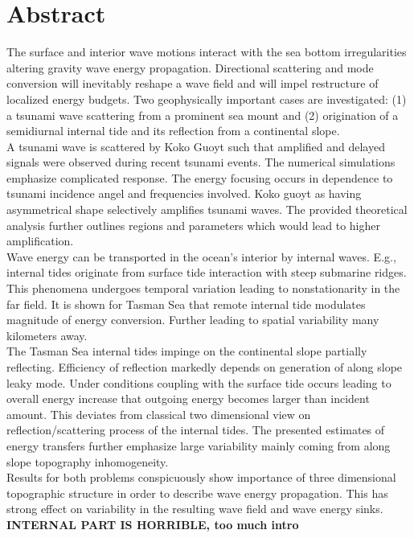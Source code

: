 \section*{Abstract}
The surface and interior wave motions interact with the sea bottom irregularities altering gravity wave energy propagation. Directional scattering and mode conversion will inevitably reshape a wave field and will impel restructure of localized energy budgets. Two geophysically important cases are investigated: (1) a tsunami wave scattering from a prominent sea mount and (2) origination of a semidiurnal internal tide and its reflection    from a continental slope.\\
A tsunami wave is scattered by Koko Guoyt such that amplified and delayed signals were observed during recent tsunami events. The numerical simulations emphasize complicated response. The energy focusing occurs in dependence to tsunami incidence angel and frequencies involved. Koko guoyt as having asymmetrical shape selectively amplifies tsunami waves. The provided theoretical analysis further outlines regions and parameters which would lead to higher amplification.\\
Wave energy can be transported in the ocean's interior by internal waves. E.g., internal tides originate from surface tide interaction with steep submarine ridges. This phenomena undergoes temporal variation leading to nonstationarity in the far field. It is shown for Tasman Sea that remote internal tide modulates magnitude of energy conversion. Further leading to spatial variability many kilometers away.\\
The Tasman Sea internal tides impinge on the continental slope partially reflecting. Efficiency of reflection markedly depends on generation of along slope leaky mode. Under conditions coupling with the surface tide occurs leading to overall energy increase that outgoing energy becomes larger than incident amount. This deviates from classical two dimensional view on reflection/scattering process of the internal tides. The presented estimates of energy transfers further emphasize large variability mainly coming from along slope topography inhomogeneity.\\
Results for both problems conspicuously show importance of three dimensional topographic structure in order to describe wave energy propagation. This has strong effect on variability in the resulting wave field and wave energy sinks.\\
\textbf{INTERNAL PART IS HORRIBLE, too much intro}

